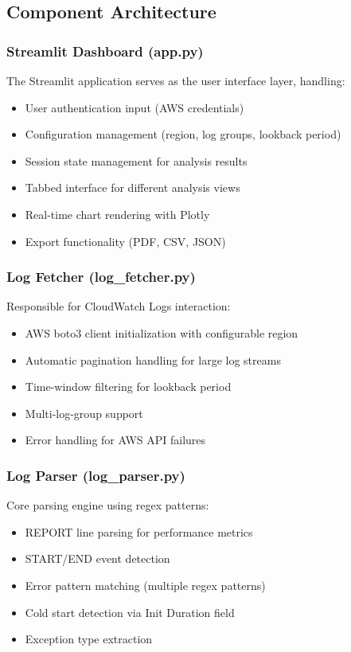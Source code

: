 \documentclass[12pt,a4paper]{article}
\begin{document}
\subsection{Component Architecture}

\subsubsection{Streamlit Dashboard (app.py)}
The Streamlit application serves as the user interface layer, handling:
\begin{itemize}
    \item User authentication input (AWS credentials)
    \item Configuration management (region, log groups, lookback period)
    \item Session state management for analysis results
    \item Tabbed interface for different analysis views
    \item Real-time chart rendering with Plotly
    \item Export functionality (PDF, CSV, JSON)
\end{itemize}

\subsubsection{Log Fetcher (log\_fetcher.py)}
Responsible for CloudWatch Logs interaction:
\begin{itemize}
    \item AWS boto3 client initialization with configurable region
    \item Automatic pagination handling for large log streams
    \item Time-window filtering for lookback period
    \item Multi-log-group support
    \item Error handling for AWS API failures
\end{itemize}

\subsubsection{Log Parser (log\_parser.py)}
Core parsing engine using regex patterns:
\begin{itemize}
    \item REPORT line parsing for performance metrics
    \item START/END event detection
    \item Error pattern matching (multiple regex patterns)
    \item Cold start detection via Init Duration field
    \item Exception type extraction
\end{itemize}
\end{document}
